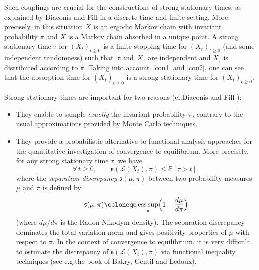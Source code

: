 \documentclass[10pt]{amsart}
\theoremstyle{plain}
\theoremstyle{definition}
\newcommand{\PP}{{\mathbb P}}
\newcommand\df{\coloneqq}
\newcommand{\bq}{\begin{equation*}}
\newcommand{\eq}{\end{equation*}}
\newcommand{\fo}{\forall\,}
\DeclareMathOperator*{\esssup}{ess\,sup}
\let\f\frac
\newcommand{\cL}{\mathcal{L}}
\newcommand{\fs}{\mathfrak{s}}
\providecommand{\eg}{e.g.}\providecommand{\ie}{i.e.}\providecommand{\resp}{resp.}\let\Subsection\subsection
\providecommand{\cf}{cf.}\providecommand{\etc}{etc.}
\begin{document}
Such couplings are crucial for the constructions of strong stationary times, as explained by Diaconis and Fill \cite{MR1071805} in a discrete time and finite setting.
More precisely, in this situation $X$ is an ergodic Markov chain with invariant probability $\pi$ and $\bar X$ is a Markov chain absorbed in a unique point.
A strong stationary time $\tau$ for $(X_t)_{t\geq 0}$ is a finite stopping time for $(X_t)_{t\geq 0}$ (and some independent randomness) such that~$\tau$ and~$X_\tau$ are independent and $X_\tau$ is distributed according to $\pi$. Taking into account~\eqref{cou1} and \eqref{cou2}, one can see that the absorption time for $(\bar X_t)_{t\geq 0}$ is a strong stationary time for $(X_t)_{t\geq 0}$.
\par
Strong stationary times are important for two reasons (\cf Diaconis and Fill \cite{MR1071805}):
\begin{itemize}
\item
They enable to sample \textit{exactly} the invariant probability $\pi$, contrary to the usual approximations provided by Monte Carlo techniques.

\item
They provide a probabilistic alternative to functional analysis approaches for the quantitative investigation of convergence to equilibrium. More precisely, for any strong stationary time $\tau$, we have
\bq
\fo t\geq 0,\qquad \fs(\cL(X_t),\pi)\leq \PP[\tau>t],
\eq
where the \emph{separation discrepancy} $\fs(\mu,\pi)$ between two probability measures $\mu$ and $\pi$ is defined by
\bq
\fs(\mu,\pi)\df\esssup_{\pi}\Bigl(1-\f{d\mu}{d\pi}\Bigr)\eq
(where $d\mu/d\pi$ is the Radon-Nikodym density). The separation discrepancy dominates the total variation norm and gives positivity properties of $\mu$ with respect to $\pi$.
In the context of convergence to equilibrium, it is very difficult to estimate the discrepancy of $\fs(\cL(X_t),\pi)$ via functional inequality techniques (see \eg the book \cite{MR3155209} of Bakry, Gentil and Ledoux).
\end{itemize}
\end{document}
